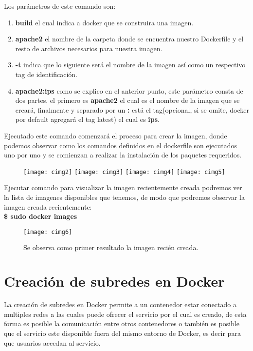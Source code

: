 \documentclass[10pt,letterpaper]{article}
\begin{document}
\begin{enumerate}
Los par\'ametros de este comando son:
\begin{enumerate}
\item \textbf{build} el cual indica a docker que se construira una imagen.
\item \textbf{apache2} el nombre de la carpeta donde se encuentra nuestro Dockerfile y el resto de 			archivos necesarios para nuestra imagen.
\item \textbf{-t} indica que lo siguiente ser\'a el nombre de la imagen as\'i como un respectivo tag de 		identificaci\'on.
\item \textbf{apache2:ips} como se explico en el anterior punto, este par\'ametro consta de dos partes, 		el primero es \textbf{apache2} el cual es el nombre de la imagen que se crear\'a, finalmente y separado 		por un \textbf{:} est\'a el tag(opcional, si se omite, docker por default agregar\'a el tag latest) el 		cual es \textbf{ips}.
\end{enumerate}


Ejecutado este comando comenzar\'a el proceso para crear la imagen, donde podemos observar como los comandos definidos en el dockerfile son ejecutados uno por uno y se comienzan a realizar la instalaci\'on de los paquetes requeridos.

\begin{figure}[h!]
\texttt{[image: cimg2]}
\centering
\texttt{[image: cimg3]}
\centering
\texttt{[image: cimg4]}
\centering
\texttt{[image: cimg5]}
\centering
\end{figure}

\clearpage

Ejecutar comando para visualizar la imagen recientemente creada podremos ver la lista de imagenes disponibles que tenemos, de modo que podremos observar la imagen creada recientemente:\\

\textbf{\$ sudo docker images} 
\begin{figure}[h!]
\centering
\texttt{[image: cimg6]}
\caption{Se observa como primer resultado la imagen reci\'en creada.}
\end{figure}

\newpage
\section{Creaci\'on de subredes en Docker}

La creaci\'on de subredes en Docker permite a un contenedor estar conectado a multiples redes a las cuales puede ofrecer el servicio por el cual es creado, de esta forma es posible la comunicaci\'on entre otros contenedores o tambi\'en es posible que el servicio este disponible fuera del mismo entorno de Docker, es decir para que usuarios accedan al servicio.


\end{enumerate}
\end{document}
